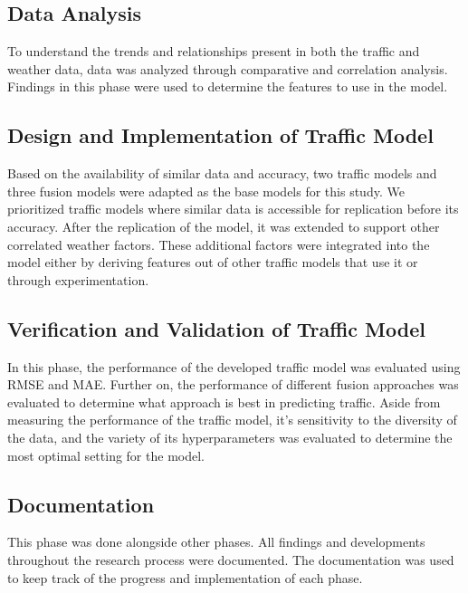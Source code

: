 \subsection{Data Analysis}
To understand the trends and relationships present in both the traffic and weather data, data was analyzed through comparative and correlation analysis. Findings in this phase were used to determine the features to use in the model.

\subsection{Design and Implementation of Traffic Model}
Based on the availability of similar data and accuracy, two  traffic models and three fusion models were adapted as the base models for this study. We prioritized traffic models where similar data is accessible for replication before its accuracy. After the replication of the model, it was extended to support other correlated weather factors. These additional factors were integrated into the model either by deriving features out of other traffic models that use it or through experimentation. 

\subsection{Verification and Validation of Traffic Model}
In this phase, the performance of the developed traffic model was evaluated using RMSE and MAE. Further on, the performance of different fusion approaches was evaluated to determine what approach is best in predicting traffic. Aside from measuring the performance of the traffic model, it’s sensitivity to the diversity of the data, and the variety of its hyperparameters was evaluated to determine the most optimal setting for the model. 


\subsection{Documentation}
This phase was done alongside other phases. All findings and developments throughout the research process were documented. The documentation was used to keep track of the progress and implementation of each phase.



